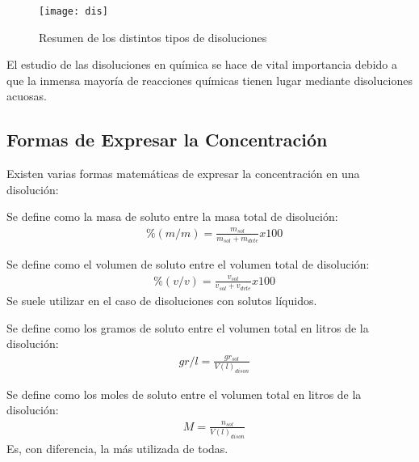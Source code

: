 \begin{figure}[h!]
	\centering
	\texttt{[image: dis]}
	\caption{Resumen de los distintos tipos de disoluciones}
\end{figure}  

El estudio de las disoluciones en química se hace de vital importancia debido a que la inmensa mayoría de reacciones químicas tienen lugar mediante disoluciones acuosas.

\subsection{Formas de Expresar la Concentración}

Existen varias formas matemáticas de expresar la concentración en una disolución:\\

\begin{definition}
	Se define como la masa de soluto entre la masa total de disolución:
	\begin{align}
		& \%(m/m)=\frac{m_{sol}}{m_{sol}+m_{dvte}}x100
	\end{align}
\end{definition}

\begin{definition}
Se define como el volumen de soluto entre el volumen total de disolución:
	\begin{align}
	& \%(v/v)=\frac{v_{sol}}{v_{sol}+v_{dvte}}x100
	\end{align}
Se suele utilizar en el caso de disoluciones con solutos líquidos.
\end{definition}

\begin{definition}
	Se define como los gramos de soluto entre el volumen total en litros de la disolución:
	\begin{align}
		& gr/l =\frac{gr_{sol}}{V(l)_{dison}}
	\end{align}
\end{definition}

\begin{definition}[Molaridad]
	Se define como los moles de soluto entre el volumen total en litros de la disolución:
	\begin{align}
		& M =\frac{n_{sol}}{V(l)_{dison}}
	\end{align}
Es, con diferencia, la más utilizada de todas.
\end{definition}

